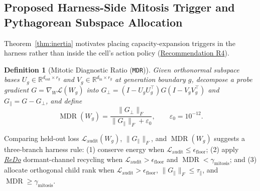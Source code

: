 \documentclass[10pt,a4paper]{article}
\newtheorem{definition}[theorem]{Definition}
\begin{document}
\subsection{Proposed Harness-Side Mitosis Trigger and Pythagorean Subspace Allocation}

Theorem~\ref{thm:inertia} motivates placing capacity-expansion triggers in the harness rather than inside the cell's action policy (\href{https://github.com/Moissanite-Labs/weft/issues/111}{Recommendation R4}).

\begin{definition}[Mitotic Diagnostic Ratio (\texttt{MDR})]\label{def:mdr}
Given orthonormal subspace bases $U_g \in \mathbb{R}^{d_{\text{out}} \times r_g}$ and $V_g \in \mathbb{R}^{d_{\text{in}} \times r_g}$ at generation boundary $g$, decompose a probe gradient $G = \nabla_W \mathcal{L}(W_g)$ into $G_\perp = (I - U_g U_g^\top) G (I - V_g V_g^\top)$ and $G_\parallel = G - G_\perp$, and define
\begin{equation}
  \operatorname{MDR}(W_g) = \frac{\|G_\perp\|_F}{\|G_\parallel\|_F + \varepsilon_0}, \qquad \varepsilon_0 = 10^{-12}.
\end{equation}
\end{definition}

Comparing held-out loss $\mathcal{L}_{\text{audit}}(W_g)$, $\|G_\parallel\|_F$, and $\operatorname{MDR}(W_g)$ suggests a three-branch harness rule: (1) conserve energy when $\mathcal{L}_{\text{audit}} \le \epsilon_{\text{floor}}$; (2) apply \href{https://arxiv.org/abs/2302.12902}{\emph{ReDo}} dormant-channel recycling when $\mathcal{L}_{\text{audit}} > \epsilon_{\text{floor}}$ and $\operatorname{MDR} < \gamma_{\text{mitosis}}$; and (3) allocate orthogonal child rank when $\mathcal{L}_{\text{audit}} > \epsilon_{\text{floor}}$, $\|G_\parallel\|_F \le \tau_{\parallel}$, and $\operatorname{MDR} \ge \gamma_{\text{mitosis}}$.
\end{document}
